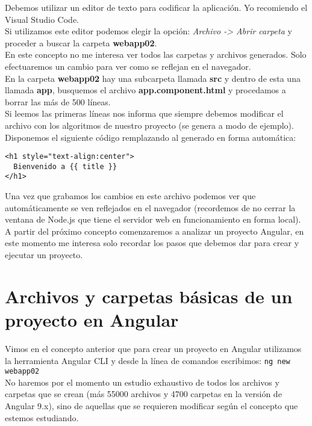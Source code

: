 \documentclass[12pt]{book} %
\begin{document}
Debemos utilizar un editor de texto para codificar la aplicación. Yo recomiendo el Visual Studio Code.\\

Si utilizamos este editor podemos elegir la opción: \emph{Archivo -> Abrir carpeta} y proceder a buscar la carpeta \textbf{webapp02}.\\

En este concepto no me interesa ver todos las carpetas y archivos generados. Solo efectuaremos un cambio para ver como se reflejan en el navegador.\\

En la carpeta \textbf{webapp02} hay una subcarpeta llamada \textbf{src} y dentro de esta una llamada \textbf{app}, busquemos el archivo \textbf{app.component.html} y procedamos a borrar las más de 500 líneas.\\

Si leemos las primeras líneas nos informa que siempre debemos modificar el archivo con los algoritmos de nuestro proyecto (se genera a modo de ejemplo).\\

Disponemos el siguiente código remplazando al generado en forma automática:

\begin{verbatim}
<h1 style="text-align:center">
  Bienvenido a {{ title }}
</h1>
\end{verbatim}

Una vez que grabamos los cambios en este archivo podemos ver que automáticamente se ven reflejados en el navegador (recordemos de no cerrar la ventana de Node.js que tiene el servidor web en funcionamiento en forma local).\\

A partir del próximo concepto comenzaremos a analizar un proyecto Angular, en este momento me interesa solo recordar los pasos que debemos dar para crear y ejecutar un proyecto.

\chapter{Archivos y carpetas básicas de un proyecto en Angular}
Vimos en el concepto anterior que para crear un proyecto en Angular utilizamos la herramienta Angular CLI y desde la línea de comandos escribimos: \verb_ng new webapp02_\\

No haremos por el momento un estudio exhaustivo de todos los archivos y carpetas que se crean (más 55000 archivos y 4700 carpetas en la versión de Angular 9.x), sino de aquellas que se requieren modificar según el concepto que estemos estudiando.\\
\end{document}
